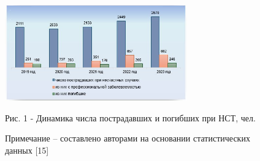 \begin{figure}[H]
	\centering
	\includegraphics[width=0.7\textwidth]{media/ekon/image5.1}
	\caption*{Рис. 1 - Динамика числа пострадавших и погибших при НСТ, чел.}
  \caption*{Примечание -- составлено авторами на основании статистических
  данных {[}15{]}}
\end{figure}

